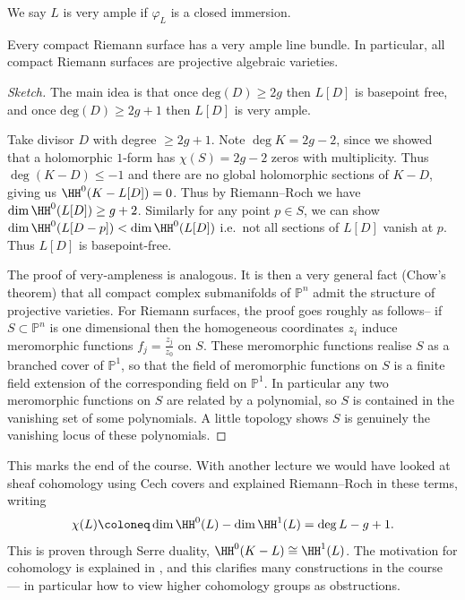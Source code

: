 \begin{definition}
    We say \(L\) is very ample if \(\varphi_L\) is a closed immersion.
\end{definition}

\begin{theorem}
    Every compact Riemann surface has a very ample line bundle. In particular,
    all compact Riemann surfaces are projective algebraic varieties.

    \begin{proof}[Sketch]
        The main idea is that once \(\text{deg}(D)\geq 2g\) then \(L[D]\) is
        basepoint free, and once \(\text{deg}(D)\geq 2g+1\) then \(L[D]\) is
        very ample.

        Take divisor \(D\) with degree \(\geq 2g+1\). Note \(\deg K = 2g-2\),
        since we showed that a holomorphic \(1\)-form has \(\chi(S)=2g-2\)
        zeros with multiplicity. Thus \(\deg(K-D)\leq -1\) and there are no
        global holomorphic sections of \(K-D\), giving us
        \(\HH^0(K-L[D])=0\). Thus by Riemann--Roch we have
        \(\dim\HH^0(L[D])\geq g+2\). Similarly for any point \(p\in S\), we can
        show \(\dim \HH^0(L[D-p])< \dim \HH^0(L[D])\) i.e.\ not all sections of
        \(L[D]\) vanish at \(p\).  Thus \(L[D]\) is basepoint-free.

        The proof of very-ampleness is analogous. It is then a very general fact
        (Chow's theorem) that all compact complex submanifolds of
        \(\mathbb{P}^n\) admit the structure of projective varieties. For
        Riemann surfaces, the proof goes roughly as follows-- if \(S\subset
        \mathbb{P}^n\) is one dimensional then the homogeneous coordinates
        \(z_i\) induce meromorphic functions  \(f_j=\frac{z_j}{z_0}\) on \(S\).
        These meromorphic functions realise \(S\) as a branched cover
        of \(\mathbb{P}^1\), so that the field of meromorphic functions on
        \(S\) is a finite field extension of the corresponding field on
        \(\mathbb{P}^1\). In particular any two meromorphic functions on
        \(S\) are related by a polynomial, so \(S\) is contained in the
        vanishing set of some polynomials. A little topology shows \(S\) is
        genuinely the vanishing locus of these polynomials.
    \end{proof}
\end{theorem}

This marks the end of the course. With another lecture we would have looked at
sheaf cohomology using Cech covers and explained Riemann--Roch in these terms,
writing \[\chi(L)\coloneq \dim \HH^0(L)-\dim\HH^1(L)=\deg L - g + 1.\] This is
proven through Serre duality, \(\HH^0(K-L)\cong \HH^1(L)\). The motivation for
cohomology is explained in \cite[chapter 12]{donaldsonRiemannSurfaces}, and
this clarifies many constructions in the course --- in particular how to view
higher cohomology groups as obstructions.
